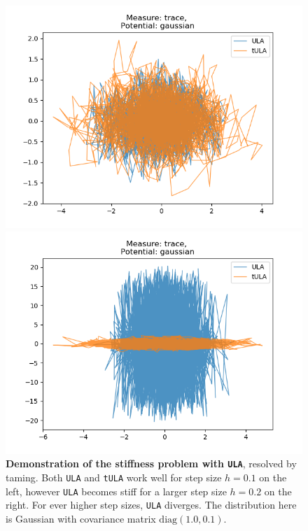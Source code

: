 \begin{figure}[H]
\centering
  \begin{minipage}[b]{0.49\textwidth}
  \centering
    \includegraphics[width=\textwidth]{Figures/ula_tula_step_01.png}
  \end{minipage} %
  \begin{minipage}[b]{0.49\textwidth}
  \centering
    \includegraphics[width=\textwidth]{Figures/ula_tula_step_02.png}
  \end{minipage}
   \caption{\textbf{Demonstration of the stiffness problem with \texttt{ULA}}, resolved by taming. Both \texttt{ULA} and \texttt{tULA} work well for step size $h = 0.1$ on the left, however \texttt{ULA} becomes stiff for a larger step size $h = 0.2$ on the right. For ever higher step sizes, \texttt{ULA} diverges. The distribution here is Gaussian with covariance matrix $\text{diag}(1.0, 0.1)$.}
\end{figure}

